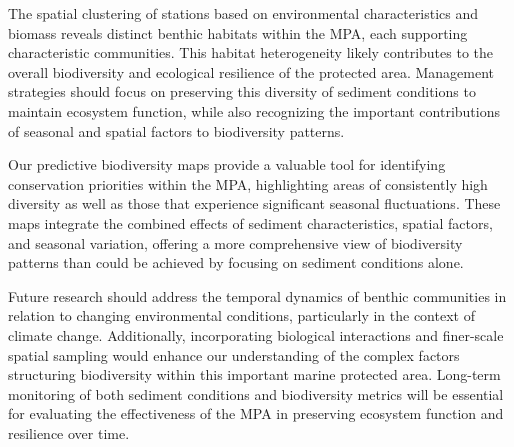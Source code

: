 \documentclass[12pt]{article}
\begin{document}
\qquad The spatial clustering of stations based on environmental characteristics
and biomass reveals distinct benthic habitats within the MPA, each supporting
characteristic communities. This habitat heterogeneity likely contributes to the
overall biodiversity and ecological resilience of the protected area. Management
strategies should focus on preserving this diversity of sediment conditions to
maintain ecosystem function, while also recognizing the important contributions
of seasonal and spatial factors to biodiversity patterns.

\qquad Our predictive biodiversity maps provide a valuable tool for identifying
conservation priorities within the MPA, highlighting areas of consistently high
diversity as well as those that experience significant seasonal fluctuations.
These maps integrate the combined effects of sediment characteristics, spatial
factors, and seasonal variation, offering a more comprehensive view of
biodiversity patterns than could be achieved by focusing on sediment conditions
alone.

\qquad Future research should address the temporal dynamics of benthic
communities in relation to changing environmental conditions, particularly in
the context of climate change. Additionally, incorporating biological
interactions and finer-scale spatial sampling would enhance our understanding of
the complex factors structuring biodiversity within this important marine
protected area. Long-term monitoring of both sediment conditions and
biodiversity metrics will be essential for evaluating the effectiveness of the
MPA in preserving ecosystem function and resilience over time.



\newpage






\end{document}
